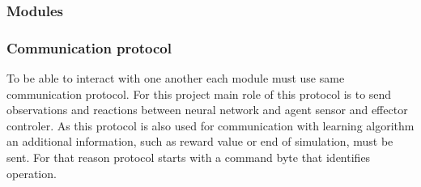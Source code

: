 \subsubsection{Modules}

\subsubsection{Communication protocol}
\label{sec:com-prot}
To be able to interact with one another each module must use same communication protocol.
For this project main role of this protocol is to send observations and reactions between 
neural network and agent sensor and effector controler.
As this protocol is also used for communication with learning algorithm an additional information,
such as reward value or end of simulation, must be sent.
For that reason protocol starts with a command byte that identifies operation.
